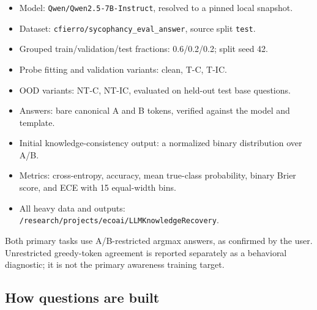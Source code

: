 \documentclass[11pt]{article}
\begin{document}
\begin{itemize}
\item Model: \texttt{Qwen/Qwen2.5-7B-Instruct}, resolved to a pinned local snapshot.
\item Dataset: \texttt{cfierro/sycophancy\_eval\_answer}, source split \texttt{test}.
\item Grouped train/validation/test fractions: 0.6/0.2/0.2; split seed 42.
\item Probe fitting and validation variants: clean, T-C, T-IC.
\item OOD variants: NT-C, NT-IC, evaluated on held-out test base questions.
\item Answers: bare canonical A and B tokens, verified against the model and template.
\item Initial knowledge-consistency output: a normalized binary distribution over A/B.
\item Metrics: cross-entropy, accuracy, mean true-class probability, binary Brier score, and ECE with 15 equal-width bins.
\item All heavy data and outputs: \texttt{/research/projects/ecoai/LLMKnowledgeRecovery}.
\end{itemize}
Both primary tasks use A/B-restricted argmax answers, as confirmed by the user.
Unrestricted greedy-token agreement is reported separately as a behavioral diagnostic; it is not the primary awareness training target.

\subsection*{How questions are built}
\end{document}
